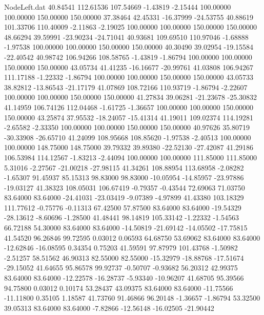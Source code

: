 \begin{filecontents}{NodeLeft.dat}
  40.84541  112.61536  107.54669    -1.43819   -2.15444  100.00000  100.00000  150.00000  150.00000   37.38464   42.45331  -16.37999  -24.53755
  40.88619  101.33706  110.40009    -2.11863   -2.19025  100.00000  100.00000  150.00000  150.00000   48.66294   39.59991  -23.90234  -24.71041
  40.93681  109.69510  110.97046    -1.68888   -1.97538  100.00000  100.00000  150.00000  150.00000   40.30490   39.02954  -19.15584  -22.40542
  40.98742  106.94266  108.58765    -1.43819   -1.86794  100.00000  100.00000  150.00000  150.00000   43.05734   41.41235  -16.16677  -20.99761
  41.03808  106.94267  111.17188    -1.22332   -1.86794  100.00000  100.00000  150.00000  150.00000   43.05733   38.82812  -13.86543  -21.17179
  41.07869  108.72166  110.93719    -1.86794   -2.22607  100.00000  100.00000  150.00000  150.00000   41.27834   39.06281  -21.23678  -25.30832
  41.14959  106.74126  112.04468    -1.61725   -1.36657  100.00000  100.00000  150.00000  150.00000   43.25874   37.95532  -18.24057  -15.41314
  41.19011  109.02374  114.19281    -2.65582   -2.33350  100.00000  100.00000  150.00000  150.00000   40.97626   35.80719  -30.33908  -26.65710
  41.24099  108.95668  108.85620    -1.97538   -2.40513  100.00000  100.00000  148.75000  148.75000   39.79332   39.89380  -22.52130  -27.42087
  41.29186  106.53984  114.12567    -1.83213   -2.44094  100.00000  100.00000  111.85000  111.85000    5.31016   -2.27567  -21.00218  -27.98115
  41.34261  108.88954  113.68958    -2.08282   -1.65307   91.45937   85.15313   98.83000   98.83000  -10.05954  -14.85957  -23.97886  -19.03127
  41.38323  108.05031  106.67419    -0.79357   -0.43544   72.69063   71.03750   83.64000   83.64000  -24.41031  -23.03419   -9.07389   -4.97899
  41.43380  103.18329  111.77612    -0.75776   -0.11313   67.42500   57.87500   83.64000   83.64000  -19.54329  -28.13612   -8.60696   -1.28500
  41.48441   98.14819  105.33142    -1.22332   -1.54563   66.72188   54.30000   83.64000   83.64000  -14.50819  -21.69142  -14.05502  -17.75815
  41.54520   96.26846   99.72595     0.03012    0.06593   64.68750   53.69062   83.64000   83.64000  -12.62846  -16.08595    0.34354    0.75203
  41.59591   97.87979  101.43768    -1.50982   -2.51257   58.51562   46.90313   82.55000   82.55000  -15.32979  -18.88768  -17.51674  -29.15052
  41.64655   95.86578   99.92737    -0.50707   -0.93682   56.20312   42.99375   83.64000   83.64000  -12.22578  -16.28737   -5.93340  -10.96207
  41.68705   95.39566   94.75800     0.03012    0.10174   53.28437   43.09375   83.64000   83.64000  -11.75566  -11.11800    0.35105    1.18587
  41.73760   91.46866   96.20148    -1.36657   -1.86794   53.32500   39.05313   83.64000   83.64000   -7.82866  -12.56148  -16.02505  -21.90442

\end{filecontents}
